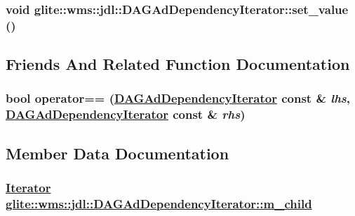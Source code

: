 \hypertarget{structglite_1_1wms_1_1jdl_1_1DAGAdDependencyIterator_a1}{
\subsubsection[set\_\-value]{\setlength{\rightskip}{0pt plus 5cm}void glite::wms::jdl::DAGAd\-Dependency\-Iterator::set\_\-value ()}}
\label{structglite_1_1wms_1_1jdl_1_1DAGAdDependencyIterator_a1}




\subsection{Friends And Related Function Documentation}
\hypertarget{structglite_1_1wms_1_1jdl_1_1DAGAdDependencyIterator_n0}{
\subsubsection[operator==]{\setlength{\rightskip}{0pt plus 5cm}bool operator== (\hyperlink{structglite_1_1wms_1_1jdl_1_1DAGAdDependencyIterator}{DAGAd\-Dependency\-Iterator} const \& {\em lhs}, \hyperlink{structglite_1_1wms_1_1jdl_1_1DAGAdDependencyIterator}{DAGAd\-Dependency\-Iterator} const \& {\em rhs})}}
\label{structglite_1_1wms_1_1jdl_1_1DAGAdDependencyIterator_n0}




\subsection{Member Data Documentation}
\hypertarget{structglite_1_1wms_1_1jdl_1_1DAGAdDependencyIterator_o4}{
\subsubsection[m\_\-child]{\setlength{\rightskip}{0pt plus 5cm}\hyperlink{structglite_1_1wms_1_1jdl_1_1DAGAdDependencyIterator_w1}{Iterator} \hyperlink{structglite_1_1wms_1_1jdl_1_1DAGAdDependencyIterator_o4}{glite::wms::jdl::DAGAd\-Dependency\-Iterator::m\_\-child}}}
\label{structglite_1_1wms_1_1jdl_1_1DAGAdDependencyIterator_o4}


